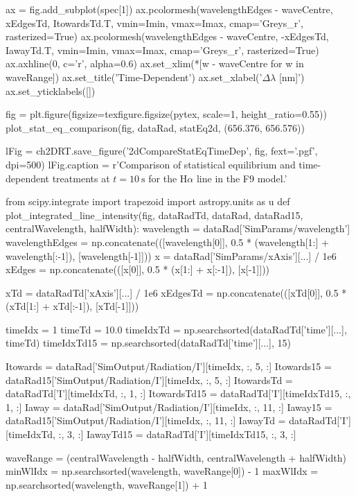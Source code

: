 \begin{pycode}[2DRT]
    ax = fig.add_subplot(spec[1])
    ax.pcolormesh(wavelengthEdges - waveCentre, xEdgesTd, ItowardsTd.T, vmin=Imin, vmax=Imax, cmap='Greys_r', rasterized=True)
    ax.pcolormesh(wavelengthEdges - waveCentre, -xEdgesTd, IawayTd.T, vmin=Imin, vmax=Imax, cmap='Greys_r', rasterized=True)
    ax.axhline(0, c='r', alpha=0.6)
    ax.set_xlim(*[w - waveCentre for w in waveRange])
    ax.set_title('Time-Dependent')
    ax.set_xlabel('$\Delta\lambda$ [nm]')
    ax.set_yticklabels([])

fig = plt.figure(figsize=texfigure.figsize(pytex, scale=1, height_ratio=0.55))
plot_stat_eq_comparison(fig, dataRad, statEq2d, (656.376, 656.576))

lFig = ch2DRT.save_figure('2dCompareStatEqTimeDep', fig, fext='.pgf', dpi=500)
lFig.caption = r'Comparison of statistical equilibrium and time-dependent treatments at $t=\SI{10}{\second}$ for the H$\alpha$ line in the F9 model.'

from scipy.integrate import trapezoid
import astropy.units as u
def plot_integrated_line_intensity(fig, dataRadTd, dataRad, dataRad15, centralWavelength, halfWidth):
    wavelength = dataRad['SimParams/wavelength']
    wavelengthEdges = np.concatenate(([wavelength[0]], 0.5 * (wavelength[1:] + wavelength[:-1]), [wavelength[-1]]))
    x = dataRad['SimParams/xAxis'][...] / 1e6
    xEdges = np.concatenate(([x[0]], 0.5 * (x[1:] + x[:-1]), [x[-1]]))

    xTd = dataRadTd['xAxis'][...] / 1e6
    xEdgesTd = np.concatenate(([xTd[0]], 0.5 * (xTd[1:] + xTd[:-1]), [xTd[-1]]))

    timeIdx = 1
    timeTd = 10.0
    timeIdxTd = np.searchsorted(dataRadTd['time'][...], timeTd)
    timeIdxTd15 = np.searchsorted(dataRadTd['time'][...], 15)

    Itowards = dataRad['SimOutput/Radiation/I'][timeIdx, :, 5, :]
    Itowards15 = dataRad15['SimOutput/Radiation/I'][timeIdx, :, 5, :]
    ItowardsTd = dataRadTd['I'][timeIdxTd, :, 1, :]
    ItowardsTd15 = dataRadTd['I'][timeIdxTd15, :, 1, :]
    Iaway = dataRad['SimOutput/Radiation/I'][timeIdx, :, 11, :]
    Iaway15 = dataRad15['SimOutput/Radiation/I'][timeIdx, :, 11, :]
    IawayTd = dataRadTd['I'][timeIdxTd, :, 3, :]
    IawayTd15 = dataRadTd['I'][timeIdxTd15, :, 3, :]

    waveRange = (centralWavelength - halfWidth, centralWavelength + halfWidth)
    minWlIdx = np.searchsorted(wavelength, waveRange[0]) - 1
    maxWlIdx = np.searchsorted(wavelength, waveRange[1]) + 1


\end{pycode}
